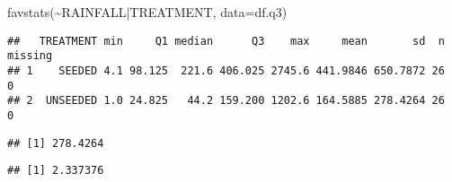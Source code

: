 \documentclass[
]{article}
\newenvironment{Shaded}{\begin{snugshade}}{\end{snugshade}}
\newcommand{\AttributeTok}[1]{\textcolor[rgb]{0.77,0.63,0.00}{#1}}
\newcommand{\DecValTok}[1]{\textcolor[rgb]{0.00,0.00,0.81}{#1}}
\newcommand{\FunctionTok}[1]{\textcolor[rgb]{0.00,0.00,0.00}{#1}}
\newcommand{\NormalTok}[1]{#1}
\newcommand{\SpecialCharTok}[1]{\textcolor[rgb]{0.00,0.00,0.00}{#1}}
\begin{document}
\begin{Shaded}
\begin{Highlighting}[]
\FunctionTok{favstats}\NormalTok{(}\SpecialCharTok{\textasciitilde{}}\NormalTok{RAINFALL}\SpecialCharTok{|}\NormalTok{TREATMENT, }\AttributeTok{data=}\NormalTok{df.q3)}
\end{Highlighting}
\end{Shaded}

\begin{verbatim}
##   TREATMENT min     Q1 median      Q3    max     mean       sd  n missing
## 1    SEEDED 4.1 98.125  221.6 406.025 2745.6 441.9846 650.7872 26       0
## 2  UNSEEDED 1.0 24.825   44.2 159.200 1202.6 164.5885 278.4264 26       0
\end{verbatim}

\begin{Shaded}
\end{Shaded}

\begin{verbatim}
## [1] 278.4264
\end{verbatim}

\begin{Shaded}
\end{Shaded}

\begin{verbatim}
## [1] 2.337376
\end{verbatim}
\end{document}
